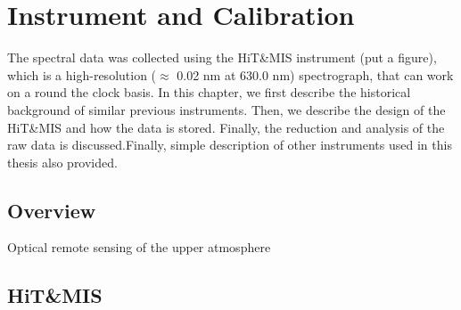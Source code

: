 \chapter{Instrument and Calibration}
The spectral data was collected using the HiT\&MIS instrument (put a figure), which is a high-resolution ($\approx$ 0.02 nm at 630.0 nm) spectrograph, that can work on a round the clock basis. In this chapter, we first describe the historical background of similar previous instruments. Then, we describe the design of the HiT\&MIS and how the data is stored. Finally, the reduction and analysis of the raw data is discussed.Finally, simple description of other instruments used in this thesis also provided.
\label{chap:background}
\section{Overview}
Optical remote sensing of the upper atmosphere
\section{HiT\&MIS}

